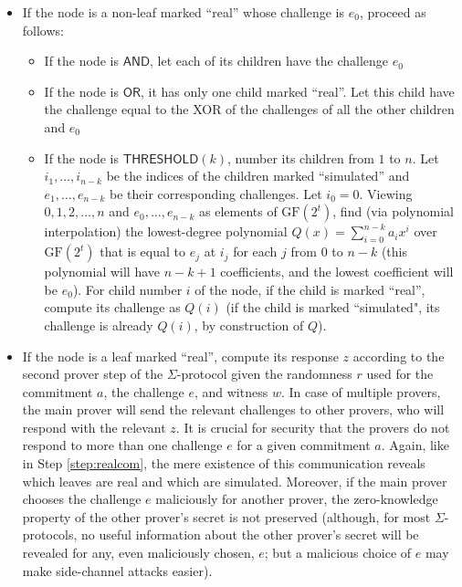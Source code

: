 \documentclass[11pt]{article}
\newcommand{\andnode}{\ensuremath{\mathsf{AND}}}
\newcommand{\ornode}{\ensuremath{\mathsf{OR}}}
\newcommand{\tnode}{\ensuremath{\mathsf{THRESHOLD}}}
\newcommand{\GF}{\ensuremath{\mathrm{GF}}}
\begin{document}
\begin{enumerate}
    \begin{itemize}
        \item If the node is a non-leaf marked ``real'' whose challenge is $e_0$, proceed as follows:
    
        \begin{itemize}
            \item If the node is $\andnode$, let each of its children have the challenge $e_0$
            \item If the node is $\ornode$, it has only one child marked ``real''. Let this child have the challenge equal to the XOR of the challenges of all the other children and $e_0$
            \item If the node is $\tnode(k)$, number its children from $1$ to $n$. Let $i_1, \dots, i_{n-k}$ be the indices of the children marked ``simulated'' and $e_1, \dots,  e_{n-k}$ be their corresponding challenges. Let $i_0 = 0$. Viewing $0, 1, 2, \dots, n$ and $e_0, \dots, e_{n-k}$ as elements of $\GF(2^t)$, find (via polynomial interpolation) the lowest-degree polynomial $Q(x)=\sum_{i=0}^{n-k} a_i x^i $ over $\GF(2^t)$ that is equal to $e_j$ at $i_j$ for each $j$ from $0$ to $n-k$ (this polynomial will have $n-k+1$ coefficients, and the lowest coefficient will be $e_0$). For child number $i$ of the node, if the child is marked ``real'', compute its challenge as $Q(i)$ (if the child is marked ``simulated", its challenge is already $Q(i)$, by construction of $Q$).
        \end{itemize}
    
        \item If the node is a leaf marked ``real'', compute its response $z$ according to the second prover step of the $\Sigma$-protocol given the randomness $r$ used for the commitment $a$, the challenge $e$, and witness $w$. In case of multiple provers, the main prover will send the relevant challenges to other provers, who will respond with the relevant $z$. It is crucial for security that the provers do not respond to more than one challenge $e$ for a given commitment $a$. Again, like in Step \ref{step:realcom}, the mere existence of this communication reveals which leaves are real and which are simulated. Moreover, if the main prover chooses the challenge $e$ maliciously for another prover, the zero-knowledge property of the other prover's secret is not preserved (although, for most $\Sigma$-protocols, no useful information about the other prover's secret will be revealed for any, even maliciously chosen, $e$; but a malicious choice of $e$ may make side-channel attacks easier).
        

\end{itemize}
\end{enumerate}
\end{document}
